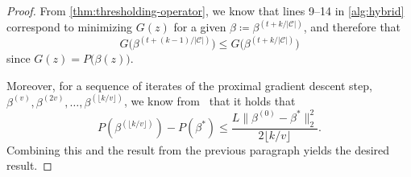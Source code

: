 \begin{proof}
  From \cref{thm:thresholding-operator}, we know that lines 9--14 in \cref{alg:hybrid} correspond to minimizing \(G(z)\) for a given \(\beta \coloneqq \beta^{(t + k / |\mathcal{C}|)}\), and therefore that
  \[
    G\big(\beta^{(t + (k - 1) / |\mathcal{C}|)}\big) \leq G\big(\beta^{(t + k / |\mathcal{C}|)}\big)
  \]
  since \(G(z) = P\big(\beta(z)\big)\).

  Moreover, for a sequence of iterates of the proximal gradient descent step,
  \(\beta^{(v)}, \beta^{(2v)}, \dots, \beta^{(\lfloor k / v \rfloor)}\),
  we know from~\textcite[Theorem 3.1]{beck2009} that it holds that
  \[
    P(\beta^{(\lfloor k / v \rfloor)}) - P(\beta^*)
    \leq \frac{L \lVert \beta^{(0)} - \beta^* \rVert_2^2}{2\lfloor k / v \rfloor}.
  \]
  Combining this and the result from the previous paragraph yields the desired
  result.
\end{proof}
